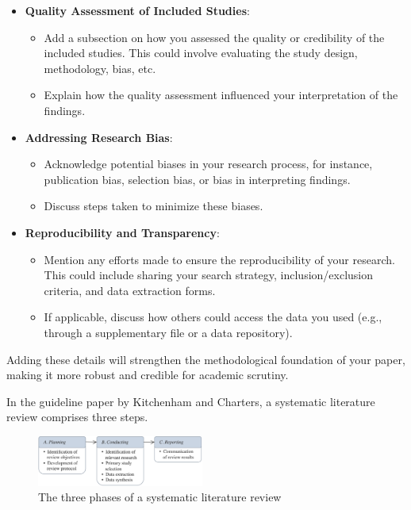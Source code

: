 \documentclass[conference]{IEEEtran}
\begin{document}
{\begin{itemize}
        \item \textbf{Quality Assessment of Included Studies}:
              \begin{itemize}
                  \item Add a subsection on how you assessed the quality or credibility of the included studies. This could involve evaluating the study design, methodology, bias, etc.
                  \item Explain how the quality assessment influenced your interpretation of the findings.
              \end{itemize}

        \item \textbf{Addressing Research Bias}:
              \begin{itemize}
                  \item Acknowledge potential biases in your research process, for instance, publication bias, selection bias, or bias in interpreting findings.
                  \item Discuss steps taken to minimize these biases.
              \end{itemize}

        \item \textbf{Reproducibility and Transparency}:
              \begin{itemize}
                  \item Mention any efforts made to ensure the reproducibility of your research. This could include sharing your search strategy, inclusion/exclusion criteria, and data extraction forms.
                  \item If applicable, discuss how others could access the data you used (e.g., through a supplementary file or a data repository).
              \end{itemize}
    \end{itemize}

    Adding these details will strengthen the methodological foundation of your paper, making it more robust and credible for academic scrutiny.}

In the guideline paper by Kitchenham and Charters\cite{GuidelinesPerformingSystematic}, a systematic literature review comprises three steps.

\begin{figure}[ht]
    \centering
    \includegraphics[width=0.489\textwidth]{images/systematic_review_diagram.png}
    \caption{The three phases of a systematic literature review\cite{GuidelinesPerformingSystematic}}
    \label{Fig:slr_diagram}
\end{figure}
\end{document}
